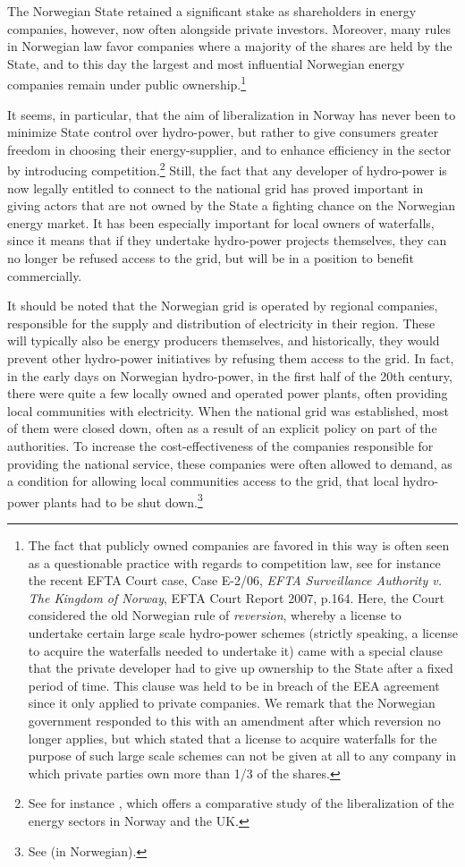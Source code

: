 The Norwegian State retained a significant stake as shareholders in energy companies, however, now often alongside private investors. Moreover, many rules in Norwegian law favor companies where a majority of the shares are held by the State, and to this day the largest and most influential Norwegian energy companies remain under public ownership.\footnote{The fact that publicly owned companies are favored in this way is often seen as a questionable practice with regards to competition law, see for instance the recent EFTA Court case, Case E-2/06, \emph{EFTA Surveillance Authority v. The Kingdom of Norway}, EFTA Court Report 2007, p.164. Here, the Court considered the old Norwegian rule of \emph{reversion}, whereby a license to undertake certain large scale hydro-power schemes (strictly speaking, a license to acquire the waterfalls needed to undertake it) came with a special clause that the private developer had to give up ownership to the State after a fixed period of time. This clause was held to be in breach of the EEA agreement since it only applied to private companies. We remark that the Norwegian government responded to this with an amendment after which reversion no longer applies, but which stated that a license to acquire waterfalls for the purpose of such large scale schemes can not be given at all to any company in which private parties own more than 1/3 of the shares.}

It seems, in particular, that the aim of liberalization in Norway has never been to minimize State control over hydro-power, but rather to give consumers greater freedom in choosing their energy-supplier, and to enhance efficiency in the sector by introducing competition.\footnote{See for instance \cite{liberal}, which offers a comparative study of the liberalization of the energy sectors in Norway and the UK.} Still, the fact that any developer of hydro-power is now legally entitled to connect to the national grid has proved important in giving actors that are not owned by the State a fighting chance on the Norwegian energy market. It has been especially important for local owners of waterfalls, since it means that if they undertake hydro-power projects themselves, they can no longer be refused access to the grid, but will be in a position to benefit commercially.

It should be noted that the Norwegian grid is operated by regional companies, responsible for the supply and distribution of electricity in their region. These will typically also be energy producers themselves, and historically, they would prevent other hydro-power initiatives by refusing them access to the grid. In fact, in the early days on Norwegian hydro-power, in the first half of the 20th century, there were quite a few locally owned and operated power plants, often providing local communities with electricity. When the national grid was established, most of them were closed down, often as a result of an explicit policy on part of the authorities. To increase the cost-effectiveness of the companies responsible for providing the national service, these companies were often allowed to demand, as a condition for allowing local communities access to the grid, that local hydro-power plants had to be shut down.\footnote{See \cite[p.111]{Hindrum} (in Norwegian).} 

